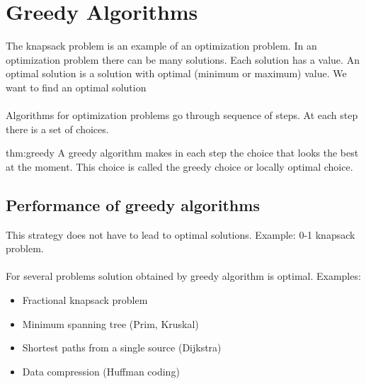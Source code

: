 \documentclass{article}[18pt]
\begin{document}
\section{Greedy Algorithms}
The knapsack problem is an example of an optimization problem. In an optimization problem there can be many solutions. Each solution has a value. An optimal solution is a solution with optimal (minimum or maximum) value. We want to find an optimal solution\\
\\
Algorithms for optimization problems go through sequence of steps. At each step there is a set of choices. 
\begin{theo}{thm:greedy}
A greedy algorithm makes in each step the choice that looks the best at the moment. This choice is called the greedy choice or locally optimal choice.
\end{theo}
\subsection{Performance of greedy algorithms}
This strategy does not have to lead to optimal solutions. Example: 0-1 knapsack problem.\\
\\
For several problems solution obtained by greedy algorithm is optimal. Examples:
\begin{itemize}
	\item Fractional knapsack problem
	\item Minimum spanning tree (Prim, Kruskal)
	\item Shortest paths from a single source (Dijkstra)
	\item Data compression (Huffman coding)
\end{itemize}
\end{document}
